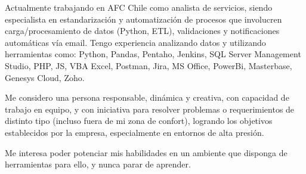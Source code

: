 

\begin{cvparagraph}

Actualmente trabajando en AFC Chile como analista de servicios, siendo especialista en estandarización y automatización de procesos que involucren carga/procesamiento de datos (Python, ETL), validaciones y notificaciones automáticas vía email. Tengo experiencia analizando datos y utilizando herramientas como: Python, Pandas, Pentaho, Jenkins, SQL Server Management Studio, PHP, JS, VBA Excel, Postman, Jira, MS Office, PowerBi, Masterbase, Genesys Cloud, Zoho.

Me considero una persona responsable, dinámica y creativa, con capacidad de trabajo en equipo, y con iniciativa para resolver problemas o requerimientos de distinto tipo (incluso fuera de mi zona de confort), logrando los objetivos establecidos por la empresa, especialmente en entornos de alta presión.

Me interesa poder potenciar mis habilidades en un ambiente que disponga de herramientas para ello, y nunca parar de aprender.

\end{cvparagraph}
